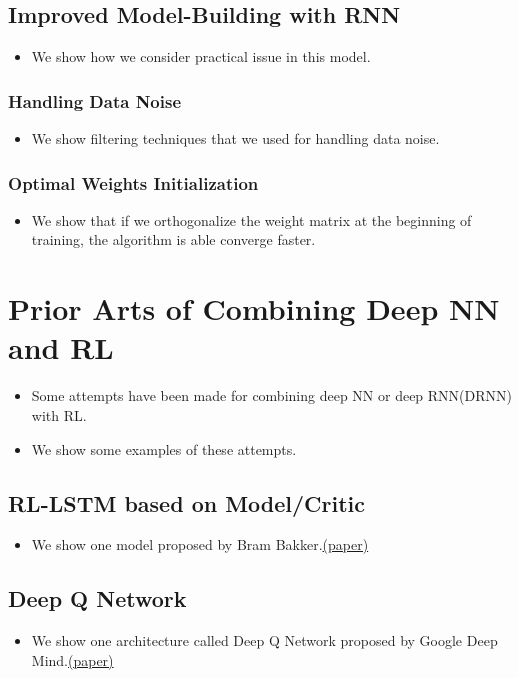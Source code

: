 \documentclass[officiallayout]{tktla}
\begin{document}
\section{Improved Model-Building with RNN} 
\begin{itemize}
\item We show how we consider practical issue in this model.
\end{itemize}
\subsection{Handling Data Noise}
\begin{itemize}
\item We show filtering techniques that we used for handling data noise.
\end{itemize}

\subsection{Optimal Weights Initialization}
\begin{itemize}
\item We show that if we orthogonalize the weight matrix at the beginning of training, the algorithm is able converge faster.
\end{itemize}

\chapter{Prior Arts of Combining Deep NN and RL}
\begin{itemize}
\item Some attempts have been made for combining deep NN or deep RNN(DRNN) with RL.
\item We show some examples of these attempts.
\end{itemize}

\section{RL-LSTM based on Model/Critic}

\begin{itemize}
\item We show one model proposed by Bram Bakker.\href{"http://citeseerx.ist.psu.edu/viewdoc/download?doi=10.1.1.115.8633&rep=rep1&type=pdf"}{(paper)}
\end{itemize}

\section{Deep Q Network}
\begin{itemize}
\item We show one architecture called Deep Q Network proposed by Google Deep Mind.\href{http://www.cs.toronto.edu/~vmnih/docs/dqn.pdf}{(paper)}
\end{itemize}
\end{document}
